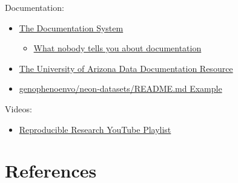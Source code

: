 \documentclass[
  letterpaper,
  DIV=11,
  numbers=noendperiod]{scrreprt}
\providecommand{\tightlist}{%
  \setlength{\itemsep}{0pt}\setlength{\parskip}{0pt}}\usepackage{longtable,booktabs,array}
\newlength{\cslhangindent}
\newenvironment{CSLReferences}[2] %
 {\begin{list}{}{%
  \setlength{\itemindent}{0pt}
  \setlength{\leftmargin}{0pt}
  \setlength{\parsep}{0pt}
  \ifodd #1
   \setlength{\leftmargin}{\cslhangindent}
   \setlength{\itemindent}{-1\cslhangindent}
  \fi
  \setlength{\itemsep}{#2\baselineskip}}}
 {\end{list}}
\begin{document}
Documentation:

\begin{itemize}
\tightlist
\item
  \href{https://documentation.divio.com/}{The Documentation System}

  \begin{itemize}
  \tightlist
  \item
    \href{https://www.youtube.com/watch?v=t4vKPhjcMZg}{What nobody tells
    you about documentation}
  \end{itemize}
\item
  \href{https://data.library.arizona.edu/data-management/best-practices/data-documentation-readme-metadata}{The
  University of Arizona Data Documentation Resource}\\
\item
  \href{https://github.com/genophenoenvo/neon-datasets/blob/main/README.md}{genophenoenvo/neon-datasets/README.md
  Example}
\end{itemize}

Videos:

\begin{itemize}
\tightlist
\item
  \href{https://www.youtube.com/playlist?list=PLy_EwS4oOnoQzWYaWDO_x5t7O1RqHwuhw}{Reproducible
  Research YouTube Playlist}
\end{itemize}


\chapter*{References}\label{references}


\label{refs}
\begin{CSLReferences}{0}{1}
\end{CSLReferences}
\end{document}
